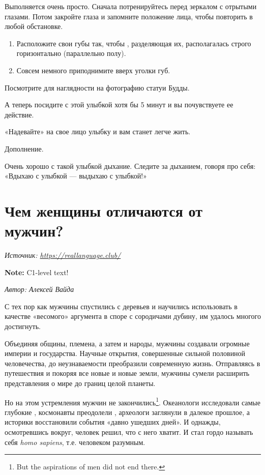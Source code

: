 Выполняется очень просто. Сначала потренируйтесь перед зеркалом с отрытыми глазами.
Потом закройте глаза и запомните положение  лица,
чтобы повторить в любой обстановке.

\begin{enumerate}[noitemsep]
    \item Расположите свои губы так, чтобы ,
          разделяющая их, располагалась строго горизонтально (параллельно полу).
    \item Совсем немного приподнимите вверх уголки губ.
\end{enumerate}

Посмотрите для наглядности на фотографию статуи Будды.

А теперь посидите с этой улыбкой хотя бы 5 минут и вы почувствуете ее действие.

«Надевайте» на свое лицо улыбку и вам станет легче жить.

Дополнение.

Очень хорошо с такой улыбкой  дыхание.
Следите за дыханием, говоря про себя: «Вдыхаю с улыбкой --- выдыхаю с улыбкой!»



\newpage
\section{Чем женщины отличаются от мужчин?}

\textit{Источник: \url{https://reallanguage.club/}}

\textbf{Note:} C1-level text!


\textit{Автор: Алексей Вайда}

С тех пор как мужчины спустились с деревьев и научились использовать в качестве «весомого» аргумента в споре с сородичами дубину, им удалось многого достигнуть.

Объединяя общины, племена, а затем и народы, мужчины создавали огромные империи и государства. Научные открытия, совершенные сильной половиной человечества, до неузнаваемости преобразили современную жизнь. Отправляясь в путешествия и покоряя все новые и новые земли, мужчины сумели расширить представления о мире до границ целой планеты.

Но на этом устремления мужчин не закончились\footnote{But the aspirations of men did not end there.}. Океанологи исследовали самые глубокие , космонавты преодолели , археологи заглянули в далекое прошлое, а историки восстановили события «давно ушедших дней». И однажды, осмотревшись вокруг, человек решил, что с него хватит. И стал гордо называть себя \textit{homo sapiens}, т.е. человеком разумным.

